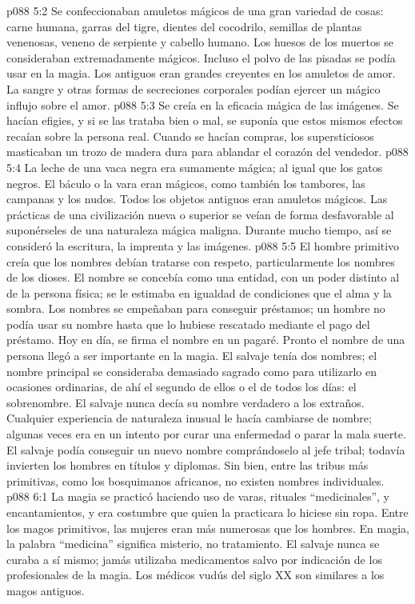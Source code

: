 \vs p088 5:2 Se confeccionaban amuletos mágicos de una gran variedad de cosas: carne humana, garras del tigre, dientes del cocodrilo, semillas de plantas venenosas, veneno de serpiente y cabello humano. Los huesos de los muertos se consideraban extremadamente mágicos. Incluso el polvo de las pisadas se podía usar en la magia. Los antiguos eran grandes creyentes en los amuletos de amor. La sangre y otras formas de secreciones corporales podían ejercer un mágico influjo sobre el amor.
\vs p088 5:3 Se creía en la eficacia mágica de las imágenes. Se hacían efigies, y si se las trataba bien o mal, se suponía que estos mismos efectos recaían sobre la persona real. Cuando se hacían compras, los supersticiosos masticaban un trozo de madera dura para ablandar el corazón del vendedor.
\vs p088 5:4 La leche de una vaca negra era sumamente mágica; al igual que los gatos negros. El báculo o la vara eran mágicos, como también los tambores, las campanas y los nudos. Todos los objetos antiguos eran amuletos mágicos. Las prácticas de una civilización nueva o superior se veían de forma desfavorable al suponérseles de una naturaleza mágica maligna. Durante mucho tiempo, así se consideró la escritura, la imprenta y las imágenes.
\vs p088 5:5 El hombre primitivo creía que los nombres debían tratarse con respeto, particularmente los nombres de los dioses. El nombre se concebía como una entidad, con un poder distinto al de la persona física; se le estimaba en igualdad de condiciones que el alma y la sombra. Los nombres se empeñaban para conseguir préstamos; un hombre no podía usar su nombre hasta que lo hubiese rescatado mediante el pago del préstamo. Hoy en día, se firma el nombre en un pagaré. Pronto el nombre de una persona llegó a ser importante en la magia. El salvaje tenía dos nombres; el nombre principal se consideraba demasiado sagrado como para utilizarlo en ocasiones ordinarias, de ahí el segundo de ellos o el de todos los días: el sobrenombre. El salvaje nunca decía su nombre verdadero a los extraños. Cualquier experiencia de naturaleza inusual le hacía cambiarse de nombre; algunas veces era en un intento por curar una enfermedad o parar la mala suerte. El salvaje podía conseguir un nuevo nombre comprándoselo al jefe tribal; todavía invierten los hombres en títulos y diplomas. Sin bien, entre las tribus más primitivas, como los bosquimanos africanos, no existen nombres individuales.
\vs p088 6:1 La magia se practicó haciendo uso de varas, rituales “medicinales”, y encantamientos, y era costumbre que quien la practicara lo hiciese sin ropa. Entre los magos primitivos, las mujeres eran más numerosas que los hombres. En magia, la palabra “medicina” significa misterio, no tratamiento. El salvaje nunca se curaba a sí mismo; jamás utilizaba medicamentos salvo por indicación de los profesionales de la magia. Los médicos vudús del siglo XX son similares a los magos antiguos.
